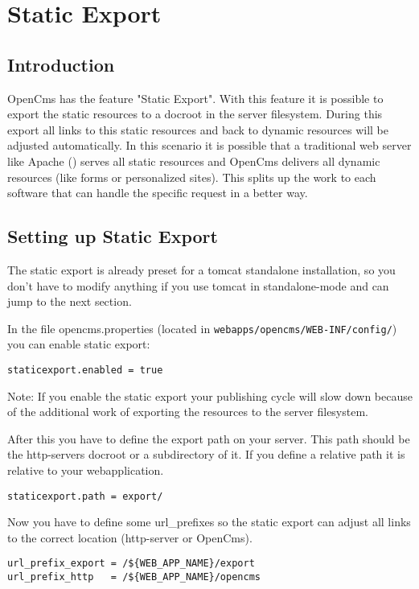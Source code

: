 \chapter{Static Export}

\section{Introduction}

OpenCms has the feature "Static Export". With this feature it is possible to export the static resources to a docroot in the server filesystem. During this export all links to this static resources and back to dynamic resources will be adjusted automatically. In this scenario it is possible that a traditional web server like Apache () serves all static resources and OpenCms delivers all dynamic resources (like forms or personalized sites). This splits up the work to each software that can handle the specific request in a better way.

\section{Setting up Static Export}

The static export is already preset for a tomcat standalone installation, so you don't have to modify anything if you use tomcat in standalone-mode and can jump to the next section.

In the file opencms.properties (located in \texttt{webapps/opencms/WEB-INF/config/}) you can enable static export:

\texttt{staticexport.enabled = true}

Note: If you enable the static export your publishing cycle will slow down because of the additional work of exporting the resources to the server filesystem.

After this you have to define the export path on your server. This path should be the http-servers docroot or a subdirectory of it. If you define a relative path it is relative to your webapplication.

\texttt{staticexport.path = export/}

Now you have to define some url\_prefixes so the static export can adjust all links to the correct location (http-server or OpenCms).

\begin{verbatim}
url_prefix_export = /${WEB_APP_NAME}/export
url_prefix_http   = /${WEB_APP_NAME}/opencms
\end{verbatim}

